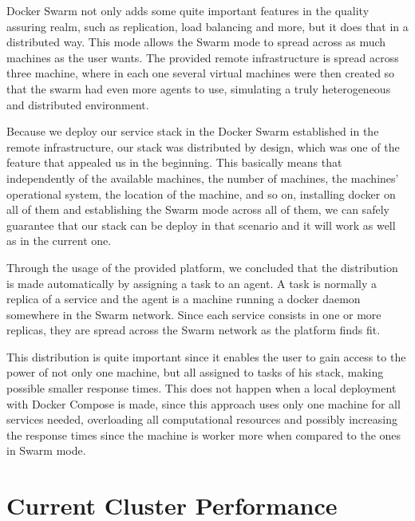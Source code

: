 \documentclass[12pt]{article}
\begin{document}
Docker Swarm not only adds some quite important features in the quality assuring realm, such as replication, load balancing and more, but it does that in a distributed way. This mode allows the Swarm mode to spread across as much machines as the user wants. The provided remote infrastructure is spread across three machine, where in each one several virtual machines were then created so that the swarm had even more agents to use, simulating a truly heterogeneous and distributed environment.

Because we deploy our service stack in the Docker Swarm established in the remote infrastructure, our stack was distributed by design, which was one of the feature that appealed us in the beginning. This basically means that independently of the available machines, the number of machines, the machines' operational system, the location of the machine, and so on, installing docker on all of them and establishing the Swarm mode across all of them, we can safely guarantee that our stack can be deploy in that scenario and it will work as well as in the current one.

Through the usage of the provided platform, we concluded that the distribution is made automatically by assigning a task to an agent. A task is normally a replica of a service and the agent is a machine running a docker daemon somewhere in the Swarm network. Since each service consists in one or more replicas, they are spread across the Swarm network as the platform finds fit.

This distribution is quite important since it enables the user to gain access to the power of not only one machine, but all assigned to tasks of his stack, making possible smaller response times. This does not happen when a local deployment with Docker Compose is made, since this approach uses only one machine for all services needed, overloading all computational resources and possibly increasing the response times since the machine is worker more when compared to the ones in Swarm mode.


\section{Current Cluster Performance} \label{performance} %

\end{document}
